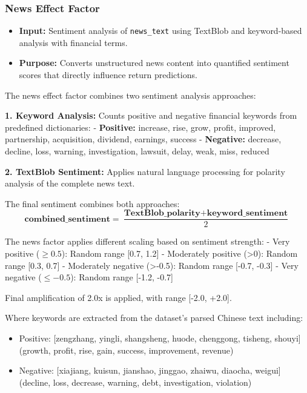 \documentclass[3p,times,procedia]{elsarticle}
\begin{document}
\subsubsection{{News Effect Factor}}
\begin{itemize}
    \item \textbf{Input:} Sentiment analysis of \texttt{news\_text} using TextBlob and keyword-based analysis with financial terms.
    \item \textbf{Purpose:} Converts unstructured news content into quantified sentiment scores that directly influence return predictions.
\end{itemize}

The news effect factor combines two sentiment analysis approaches:

\textbf{1. Keyword Analysis:} Counts positive and negative financial keywords from predefined dictionaries:
- \textbf{Positive:} increase, rise, grow, profit, improved, partnership, acquisition, dividend, earnings, success
- \textbf{Negative:} decrease, decline, loss, warning, investigation, lawsuit, delay, weak, miss, reduced

\textbf{2. TextBlob Sentiment:} Applies natural language processing for polarity analysis of the complete news text.

The final sentiment combines both approaches:
\begin{equation}
\textbf{combined\_sentiment} = \frac{\textbf{TextBlob\_polarity} + \textbf{keyword\_sentiment}}{2}
\end{equation}

The news factor applies different scaling based on sentiment strength:
- Very positive ($\geq 0.5$): Random range [0.7, 1.2] 
- Moderately positive (>0): Random range [0.3, 0.7]
- Moderately negative (>-0.5): Random range [-0.7, -0.3]  
- Very negative ($\leq -0.5$): Random range [-1.2, -0.7]

Final amplification of 2.0x is applied, with range [-2.0, +2.0].

Where keywords are extracted from the dataset's parsed Chinese text including:
\begin{itemize}
    \item Positive: [zengzhang, yingli, shangsheng, huode, chenggong, tisheng, shouyi] (growth, profit, rise, gain, success, improvement, revenue)
    \item Negative: [xiajiang, kuisun, jianshao, jinggao, zhaiwu, diaocha, weigui] (decline, loss, decrease, warning, debt, investigation, violation)
\end{itemize}
\end{document}
